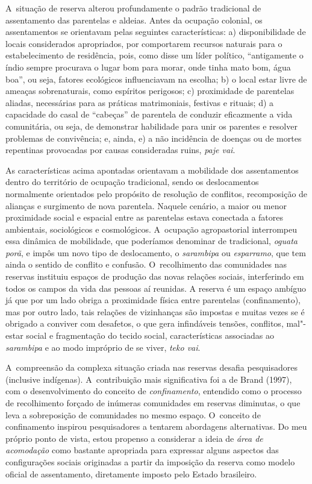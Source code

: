 A~situação de reserva alterou profundamente o padrão tradicional de
assentamento das parentelas e aldeias. Antes da ocupação colonial, os
assentamentos se orientavam pelas seguintes características: a)
disponibilidade de locais considerados apropriados, por comportarem
recursos naturais para o estabelecimento de residência, pois, como
disse um líder político, ``antigamente o índio sempre procurava o lugar
bom para morar, onde tinha mato bom, água boa'', ou seja, fatores
ecológicos influenciavam na escolha; b) o local estar livre de ameaças
sobrenaturais, como espíritos perigosos; c) proximidade de parentelas
aliadas, necessárias para as práticas matrimoniais, festivas e rituais;
d) a capacidade do casal de ``cabeças'' de parentela de conduzir
eficazmente a vida comunitária, ou seja, de demonstrar habilidade para
unir os parentes e resolver problemas de convivência; e, ainda, e) a
não incidência de doenças ou de mortes repentinas provocadas por causas
consideradas ruins, \emph{paje vai}.

As características acima apontadas orientavam a mobilidade dos
assentamentos dentro do território de ocupação tradicional, sendo os
deslocamentos normalmente orientados pelo propósito de resolução de
conflitos, recomposição de alianças e surgimento de nova parentela.
Naquele cenário, a maior ou menor proximidade social e espacial entre
as parentelas estava conectada a fatores ambientais, sociológicos e
cosmológicos. A~ocupação agropastorial interrompeu essa dinâmica de
mobilidade, que poderíamos denominar de tradicional, \emph{oguata porã}, e
impôs um novo tipo de deslocamento, o \emph{sarambipa} ou \emph{esparramo}, que tem
ainda o sentido de conflito e confusão. O~recolhimento das comunidades
nas reservas instituiu espaços de produção das novas relações sociais,
interferindo em todos os campos da vida das pessoas aí reunidas. A
reserva é um espaço ambíguo já que por um lado obriga a proximidade
física entre parentelas (confinamento), mas por outro lado, tais
relações de vizinhanças são impostas e muitas vezes se é obrigado a
conviver com desafetos, o que gera infindáveis tensões, conflitos,
mal"-estar social e fragmentação do tecido social, características
associadas ao \emph{sarambipa} e ao modo impróprio de se viver, \emph{teko vai}.

A~compreensão da complexa situação criada nas reservas desafia
pesquisadores (inclusive indígenas). A~contribuição mais significativa
foi a de Brand (1997), com o desenvolvimento do conceito de \emph{confinamento},
entendido como o processo de recolhimento forçado de inúmeras
comunidades em reservas diminutas, o que leva a sobreposição de
comunidades no mesmo espaço. O~conceito de confinamento inspirou
pesquisadores a tentarem abordagens alternativas. Do meu próprio ponto
de vista, estou propenso a considerar a ideia de \emph{área de acomodação}
como bastante apropriada para expressar alguns aspectos das
configurações sociais originadas a partir da imposição da reserva como
modelo oficial de assentamento, diretamente imposto pelo Estado
brasileiro. 

